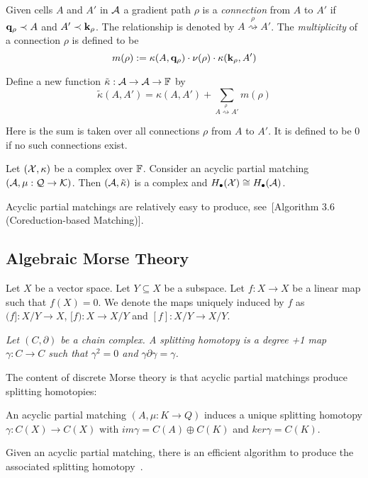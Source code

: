Given cells $A$ and $A'$ in ${\mathcal A}$ a gradient path $\rho$ is a {\em connection} from $A$ to $A'$ if ${\bf q}_\rho\prec A$ and $A'\prec {\bf k}_\rho$.  The relationship is denoted by $A\stackrel{\rho}{\rightsquigarrow} A'$.  The {\em multiplicity} of a connection $\rho$ is defined to be $$m(\rho):= \kappa(A,{\bf q}_\rho)\cdot \nu(\rho)\cdot \kappa({\bf k}_\rho,A')$$

Define a new function $\tilde \kappa:{\mathcal A}\to {\mathcal A}\to {\mathbb{F}}$ by $$\tilde\kappa (A,A')=\kappa(A,A')+\sum_{A\stackrel{\rho}{\rightsquigarrow} A'} m(\rho)$$

Here is the sum is taken over all connections $\rho$ from $A$ to $A'$.  It is defined to be 0 if no such connections exist.

\begin{prop}
Let $({\mathcal X},\kappa)$ be a complex over ${\mathbb{F}}$.  Consider an acyclic partial matching $({\mathcal A},\mu:{\mathcal Q}\to {\mathcal K})$.  Then $({\mathcal A},\tilde \kappa)$ is a complex and $H_\bullet({\mathcal X})\cong H_\bullet({\mathcal A})$.
\end{prop}

Acyclic partial matchings are relatively easy to produce, see~[Algorithm 3.6 (Coreduction-based Matching)]\cite{focm}.
 
 \subsection{Algebraic Morse Theory}
 

Let $X$ be a vector space.  Let $Y\subseteq X$ be a subspace.  Let $f:X\to X$ be a linear map such that $f(X)=0$.  We denote the maps uniquely induced by $f$ as $(f]:X/Y\to X$, $[f):X\to X/Y$ and $[f]:X/Y\to X/Y$.

\begin{defn}
{\em
Let $(C,\partial)$ be a chain complex.  A {\em splitting homotopy} is a degree +1 map $\gamma:C\to C$ such that $\gamma^2=0$ and $\gamma\partial\gamma = \gamma$.
}
\end{defn}

The content of discrete Morse theory is that acyclic partial matchings produce splitting homotopies:

\begin{prop}\label{prop:matchinghomotopy}
An acyclic partial matching $(A,\mu:K\to Q)$ induces a unique splitting homotopy $\gamma:C(X)\to C(X)$ with $im\gamma = C(A)\oplus C(K)$ and $ker\gamma = C(K)$.
\end{prop}

Given an acyclic partial matching, there is an efficient algorithm to produce the associated splitting homotopy~\cite[Algorithm 3.12 (Gamma Algorithm)]{focm}.

